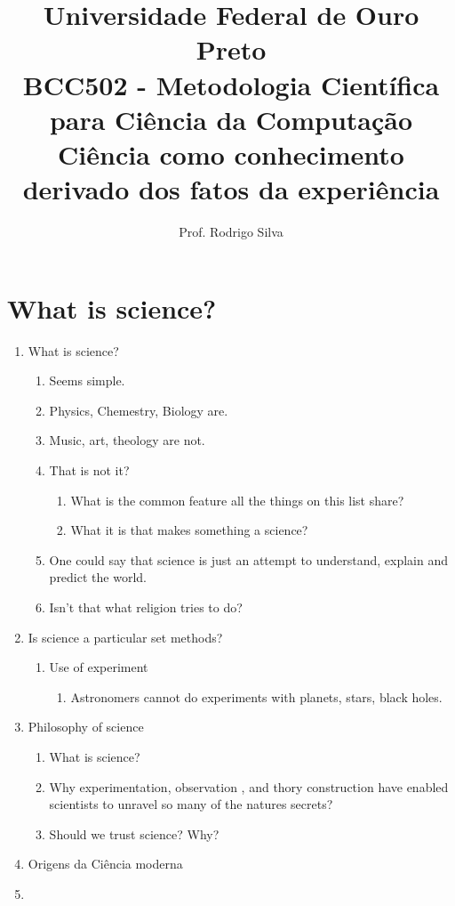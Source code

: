 \documentclass{article}
\title{\vspace{-2 cm}Universidade Federal de Ouro Preto \\ BCC502 - Metodologia Científica para Ciência da Computação \\\textbf{ Ciência como conhecimento derivado dos fatos da experiência}}
\author{Prof. Rodrigo Silva}
\date{}
\begin{document}
\maketitle

\section{What is science?}

\begin{enumerate}
    \item What is science?
    \begin{enumerate}
        \item Seems simple.
        \item Physics, Chemestry, Biology are.
        \item Music, art, theology are not.
        \item That is not it?
        \begin{enumerate}
            \item What is the common feature all the things on this list share?
            \item What it is that makes something a science? 
        \end{enumerate}
        \item One could say that science is just an attempt to understand, explain and predict the world.
        \item Isn't that what religion tries to do?
    \end{enumerate} 
    \item Is science a particular set methods?
    \begin{enumerate}
         \item Use of experiment
         \begin{enumerate}
            \item Astronomers cannot do experiments with planets, stars, black holes. 
         \end{enumerate}
    \end{enumerate}
    \item Philosophy of science
    \begin{enumerate}
        \item What is science?
        \item Why experimentation, observation , and thory construction have enabled scientists to unravel so many of the natures secrets?
        \item Should we trust science? Why?
    \end{enumerate}
    \item Origens da Ciência moderna
    \item 


    
\end{enumerate}

%
%
\end{document}
